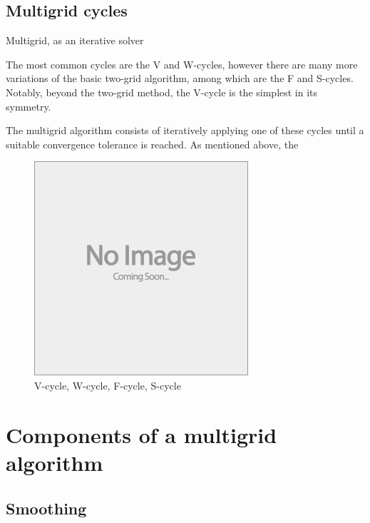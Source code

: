 \subsection{Multigrid cycles}

Multigrid, as an iterative solver

The most common cycles are the V and W-cycles, however there are many more variations of the basic two-grid algorithm, among which are the F and S-cycles.
Notably, beyond the two-grid method, the V-cycle is the simplest in its symmetry.

The multigrid algorithm consists of iteratively applying one of these cycles until a suitable convergence tolerance is reached.
As mentioned above, the 



\begin{figure}
	\centering
	\includegraphics[draft]{images/placeholder}
	\caption{V-cycle, W-cycle, F-cycle, S-cycle}
\end{figure}








\section{Components of a multigrid algorithm}

\subsection{Smoothing}

